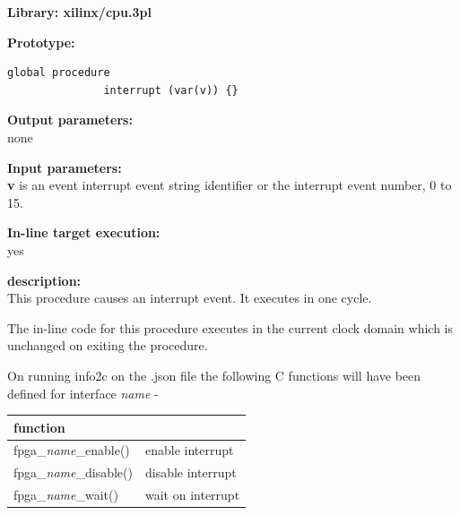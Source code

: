             {\bf Library: xilinx/cpu.3pl}

            {\bf Prototype:} \\
            \vsp
            \begin{lstlisting}[gobble=12, language=threepl]
               global procedure
               interrupt (var(v)) {}
            \end{lstlisting}

            {\bf Output parameters:} \\
            none

            {\bf Input parameters:} \\            
            {\bf v} is an event interrupt event string identifier or the
            interrupt event number, 0 to 15.
        
            {\bf In-line target execution:} \\
            yes

            {\bf description:} \\
            This procedure
            causes an interrupt event. It executes in one cycle.
            
            The in-line code for this procedure executes in the current clock
            domain which is unchanged on exiting the procedure.
            
            On running info2c on the .json file the following C functions will have been
            defined for interface {\em name} -
            
            \begin{tabular}{| l | l |}
            \hline
            function                    &                   \\ \hline \hline
            fpga\_{\em name}\_enable()  & enable interrupt  \\ \hline
            fpga\_{\em name}\_disable() & disable interrupt \\ \hline 
            fpga\_{\em name}\_wait()    & wait on interrupt \\ \hline  
            \end{tabular}
            
